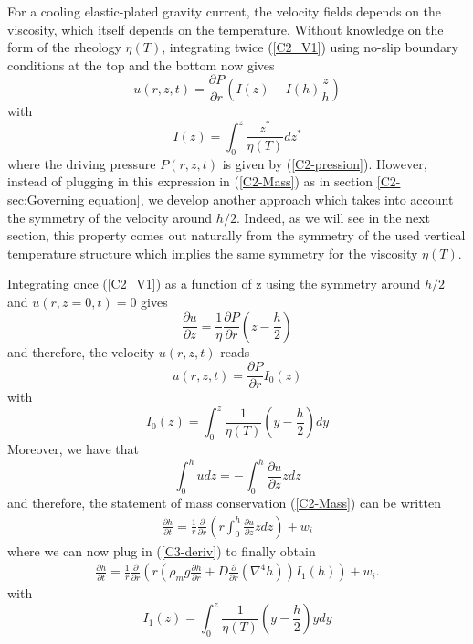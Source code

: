 For  a cooling  elastic-plated  gravity current,  the velocity  fields
depends   on   the   viscosity,    which   itself   depends   on   the
temperature. Without knowledge on the  form of the rheology $\eta(T)$,
integrating twice  (\ref{C2_V1}) using no-slip boundary  conditions at
the top and the bottom now gives
\begin{equation}
  u(r,z,t) = \frac{\partial P}{\partial r}\left(I(z)-I(h)\frac{z}{h}\right)
\end{equation}
with
\begin{equation}
  I(z) = \int_0^z\frac{z^*}{\eta(T)}dz^*
\end{equation}
where the driving pressure $P(r,z,t)$ is given by (\ref{C2-pression}).
However, instead of plugging in  this expression in (\ref{C2-Mass}) as
in  section   \ref{C2-sec:Governing  equation},  we   develop  another
approach which takes into account  the symmetry of the velocity around
$h/2$.  Indeed,  as we  will see  in the  next section,  this property
comes out naturally from the symmetry of the used vertical temperature
structure  which implies the same  symmetry for
the viscosity $\eta(T)$.

Integrating once (\ref{C2_V1})  as a function of z  using the symmetry
around $h/2$ and $u(r,z=0,t)=0$ gives
\begin{equation}
  \frac{\partial   u}{\partial   z}   =   \frac{1}{\eta}\frac{\partial
    P}{\partial r}\left(z-\frac{h}{2}\right)
\label{C3-deriv}
\end{equation}
and therefore, the velocity $u(r,z,t)$ reads
\begin{equation}
  u(r,z,t) = \frac{\partial P}{\partial r} I_0(z)
\end{equation}
with
\begin{equation}
  I_0(z) = \int_0^z\frac{1}{\eta(T)}\left(y-\frac{h}{2}\right)dy
\label{C3-I_0}
\end{equation}
Moreover, we have that
\begin{equation}
  \int_0^h u dz = -\int_0^h\frac{\partial u}{\partial z}zdz
\end{equation}
and therefore, the statement  of mass conservation (\ref{C2-Mass}) can
be written
\begin{eqnarray}
  \frac{\partial h}{\partial t} = \frac{1}{r}
  \frac{\partial}{\partial
  r} \left( r\int_0^h\frac{\partial u}{\partial z}zdz\right) + w_i
  \label{C3-Mass}
\end{eqnarray}
where we can now plug in (\ref{C3-deriv}) to finally obtain
\begin{eqnarray}
  \frac{\partial h}{\partial t} = \frac{1}{r}
  \frac{\partial}{\partial r} \left( r\left(\rho_m g \frac{\partial h}{\partial      r}+D\frac{\partial}{\partial      r}\left(\nabla^4h\right)\right)I_1(h)\right)
  + w_i.
  \label{C3-Mass-2}
\end{eqnarray}
with 
\begin{equation}
  I_1(z) = \int_0^z\frac{1}{\eta(T)}\left(y-\frac{h}{2}\right)ydy
\label{C3-I_1}
\end{equation}

